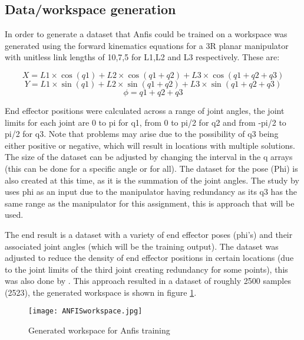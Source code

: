 \documentclass[a4paper,11pt]{article}
\begin{document}
\subsection{Data/workspace generation}
In order to generate a dataset that Anfis could be trained on a workspace was generated using the forward kinematics equations for a 3R planar manipulator with unitless link lengths of 10,7,5 for L1,L2 and L3 respectively. These are:

\[ X = L1 \times  \cos(q1)+ L2 \times \cos(q1 + q2) + L3 \times  \cos(q1 + q2 + q3) \]
\[ Y = L1 \times  \sin(q1)+ L2 \times  \sin(q1 + q2) + L3 \times  \sin(q1 + q2 + q3) \]
\[ \phi = q1 + q2 + q3\]

End effector positions were calculated across a range of joint angles, the joint limits for each joint are 0 to pi for q1, from 0 to pi/2 for q2 and from -pi/2 to pi/2 for q3. Note that problems may arise due to the possibility of q3 being either positive or negative, which will result in locations with multiple solutions. The size of the dataset can be adjusted by changing the interval in the q arrays (this can be done for a specific angle or for all). The dataset for the pose (Phi) is also created at this time, as it is the summation of the joint angles. The study by \cite{anfis2} uses phi as an input due to the manipulator having redundancy as its q3 has the same range as the manipulator for this assignment, this is approach that will be used.

The end result is a dataset with a variety of end effector poses (phi’s) and their associated joint angles (which will be the training output). The dataset was adjusted to reduce the density of end effector positions in certain locations (due to the joint limits of the third joint creating redundancy for some points), this was also done by \cite{anfis2}.
This approach resulted in a dataset of roughly 2500 samples (2523), the generated workspace is shown in figure \ref{fig:ANFISwork}.

\begin{figure}[H]
\centering
  \texttt{[image: ANFISworkspace.jpg]}
  \caption{Generated workspace for Anfis training}
\label{fig:ANFISwork}
\end{figure}
\end{document}
